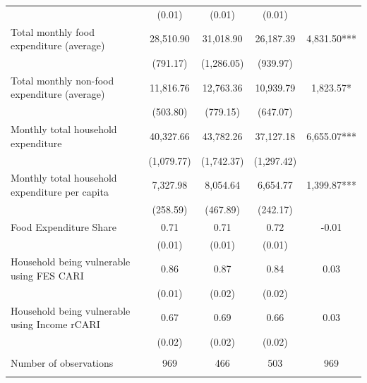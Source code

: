 \begin{tabular}{@{\extracolsep{5pt}}lcccc}
 & (0.01)  & (0.01)  & (0.01)  &  \\ [1ex]
Total monthly food expenditure (average)   & 28,510.90    & 31,018.90    & 26,187.39    & 4,831.50***   \\
 & (791.17)  & (1,286.05)  & (939.97)  &  \\ [1ex]
Total monthly non-food expenditure (average)   & 11,816.76    & 12,763.36    & 10,939.79    & 1,823.57*   \\
 & (503.80)  & (779.15)  & (647.07)  &  \\ [1ex]
Monthly total household expenditure   & 40,327.66    & 43,782.26    & 37,127.18    & 6,655.07***   \\
 & (1,079.77)  & (1,742.37)  & (1,297.42)  &  \\ [1ex]
Monthly total household expenditure per capita   & 7,327.98    & 8,054.64    & 6,654.77    & 1,399.87***   \\
 & (258.59)  & (467.89)  & (242.17)  &  \\ [1ex]
Food Expenditure Share   & 0.71    & 0.71    & 0.72    & -0.01   \\
 & (0.01)  & (0.01)  & (0.01)  &  \\ [1ex]
Household being vulnerable using FES CARI   & 0.86    & 0.87    & 0.84    & 0.03   \\
 & (0.01)  & (0.02)  & (0.02)  &  \\ [1ex]
Household being vulnerable using Income rCARI   & 0.67    & 0.69    & 0.66    & 0.03   \\
 & (0.02)  & (0.02)  & (0.02)  &  \\ [1ex]
\hline \\[-1.8ex]
Number of observations  & 969   & 466   & 503  & 969  \\
\hline \hline \\[-1.8ex]

\end{tabular}
